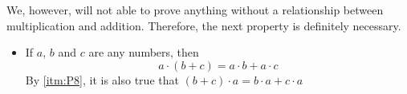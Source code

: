 \documentclass[a4paper,11pt,twoside]{book}
\theoremstyle{plain} \newtheorem{id}{Lemma}
\begin{document}
  We, however, will not able to prove anything without a
  relationship between multiplication and addition. Therefore,
  the next property is definitely necessary.
  \begin{itemize}[label=\textnormal{(\arabic*)}]
    \item[\mylabel{itm:P9}{(P9)}]
    If $a$, $b$ and $c$ are any numbers, then
    \begin{equation*}
      a\cdot(b+c)=a\cdot b+a\cdot c
    \end{equation*}
    By \ref{itm:P8}, it is also true that
    $(b+c)\cdot a=b\cdot a+c\cdot a$
  \end{itemize}
\end{document}
